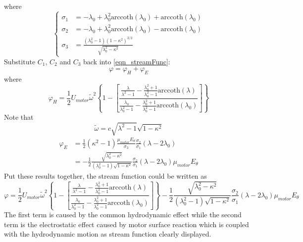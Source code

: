 \documentclass[fontsize=11pt, %
                             paper=a4, %
                             twoside, %
                             captions=tableheading,
                             index=totoc,
                             hyperref]{labbook}
\begin{document}
where
\begin{equation}
\left\{
\begin{aligned}
\sigma_1&=-\lambda_0+\lambda_0^2\mathrm{arccoth}(\lambda_0)+\mathrm{arccoth}(\lambda_0)\\
\sigma_2&=-\lambda_0+\lambda_0^2\mathrm{arccoth}(\lambda_0)-\mathrm{arccoth}(\lambda_0)\\
\sigma_3&=\frac{(\lambda_0^2-1)(1-\kappa^2)^{3/2}}{\sqrt{\lambda_0^2-\kappa^2}}
\end{aligned}
\right.
\end{equation}
Substitute $C_1$, $C_2$ and $C_3$ back into \ref{eqn_streamFunc}:
\begin{equation}
\varphi=\varphi_{H}+\varphi_{E}
\end{equation}
where
\begin{equation}
\varphi_{H}=
\frac{1}{2}U_{motor}\tilde{\omega}^2\left\{1-\left[\frac{\frac{\lambda}{\lambda^2-1}-\frac{\lambda_0^2+1}{\lambda_0^2-1}\mathrm{arccoth}(\lambda)}{\frac{\lambda_0}{\lambda_0^2-1}-\frac{\lambda_0^2+1}{\lambda_0^2-1}\mathrm{arccoth}(\lambda_0)}\right]\right\}
\end{equation}
Note that
\begin{equation}
\tilde{\omega}=c\sqrt{\lambda^2-1}\sqrt{1-\kappa^2}
\end{equation}
\begin{equation}
\begin{aligned}
\varphi_{E}&=\frac{1}{2}(\kappa^2-1)\frac{\mu_{motor}E_\theta}{\sigma_3}\frac{\sigma_2}{\sigma_1}(\lambda-2\lambda_0)\\
&=-\frac{1}{2}\frac{\sqrt{\lambda_0^2-\kappa^2}}{(\lambda_0^2-1)\sqrt{1-\kappa^2}}\frac{\sigma_2}{\sigma_1}(\lambda-2\lambda_0)\mu_{motor}E_\theta
\end{aligned}
\end{equation}
Put these results together, the stream function could be written as
\begin{equation}
\varphi=\frac{1}{2}U_{motor}\tilde{\omega}^2\left\{1-\left[\frac{\frac{\lambda}{\lambda^2-1}-\frac{\lambda_0^2+1}{\lambda_0^2-1}\mathrm{arccoth}(\lambda)}{\frac{\lambda_0}{\lambda_0^2-1}-\frac{\lambda_0^2+1}{\lambda_0^2-1}\mathrm{arccoth}(\lambda_0)}\right]\right\}-\frac{1}{2}\frac{\sqrt{\lambda_0^2-\kappa^2}}{(\lambda_0^2-1)\sqrt{1-\kappa^2}}\frac{\sigma_2}{\sigma_1}(\lambda-2\lambda_0)\mu_{motor}E_\theta
\end{equation}
The first term is caused by the common hydrodynamic effect while the second term is the electrostatic effect caused by motor surface reaction which is coupled with the hydrodynamic motion as stream function clearly displayed.\\
\end{document}
